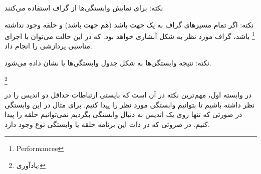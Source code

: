 \documentclass[20pt, a4paper]{article}
\begin{document}
نکته: برای نمایش وابستگی‌ها از گراف استفاده می‌کنند.

نکته: اگر تمام مسیر‌های گراف به یک جهت باشد (هم جهت باشد) و حلقه وجود نداشته
\footnote{Performancee} باشد، گراف مورد نظر به شکل آبشاری خواهد بود. که در این
حالت می‌توان با اجرای مناسبی پردازشی را انجام داد.


نکته: نتیجه وابستگی‌ها به شکل جدول وابستگی‌ها یا  نشان
داده می‌شود.


\footnote{ یادآوری:}


در وابسته اول، مهم‌ترین نکته در آن است که بایستی ارتباطات حداقل دو اندیس را در
نظر داشته باشیم تا بتوانیم وابستگی مورد نظر را پیدا کنیم. برای مثال در این
وابستگی در صورتی که تنها روی یک اندیس به دنبال وابستگی بگردیم نمی‌توانیم حلقه را
پیدا کنیم. در صروتی که در ذات این برنامه حلقه یا وابستگی نوع  وجود دارد.


\end{document}
